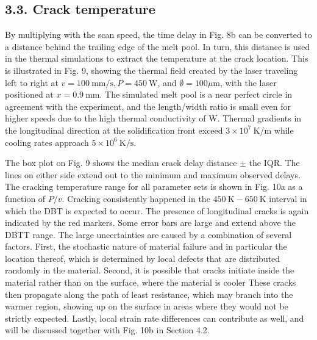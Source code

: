 \documentclass[10pt]{article}
\begin{document}
\subsection*{3.3. Crack temperature}
By multiplying with the scan speed, the time delay in Fig. 8b can be converted to a distance behind the trailing edge of the melt pool. In turn, this distance is used in the thermal simulations to extract the temperature at the crack location. This is illustrated in Fig. 9, showing the thermal field created by the laser traveling left to right at $v=100 \mathrm{~mm} / \mathrm{s}, P=450 \mathrm{~W}$, and $\emptyset=100 \mu \mathrm{m}$, with the laser positioned at $x=0.9 \mathrm{~mm}$. The simulated melt pool is a near perfect circle in agreement with the experiment, and the length/width ratio is small even for higher speeds due to the high thermal conductivity of $\mathrm{W}$. Thermal gradients in the longitudinal direction at the solidification front exceed $3 \times 10^{7} \mathrm{~K} / \mathrm{m}$ while cooling rates approach $5 \times 10^{6} \mathrm{~K} / \mathrm{s}$.

The box plot on Fig. 9 shows the median crack delay distance $\pm$ the IQR. The lines on either side extend out to the minimum and maximum observed delays. The cracking temperature range for all parameter sets is shown in Fig. 10a as a function of $P / v$. Cracking consistently happened in the $450 \mathrm{~K}-650 \mathrm{~K}$ interval in which the DBT is expected to occur. The presence of longitudinal cracks is again indicated by the red markers. Some error bars are large and extend above the DBTT range. The large uncertainties are caused by a combination of several factors. First, the stochastic nature of material failure and in particular the location thereof, which is determined by local defects that are distributed randomly in the material. Second, it is possible that cracks initiate inside the material rather than on the surface, where the material is cooler These cracks then propagate along the path of least resistance, which may branch into the warmer region, showing up on the surface in areas where they would not be strictly expected. Lastly, local strain rate differences can contribute as well, and will be discussed together with Fig. 10b in Section 4.2.
\end{document}
